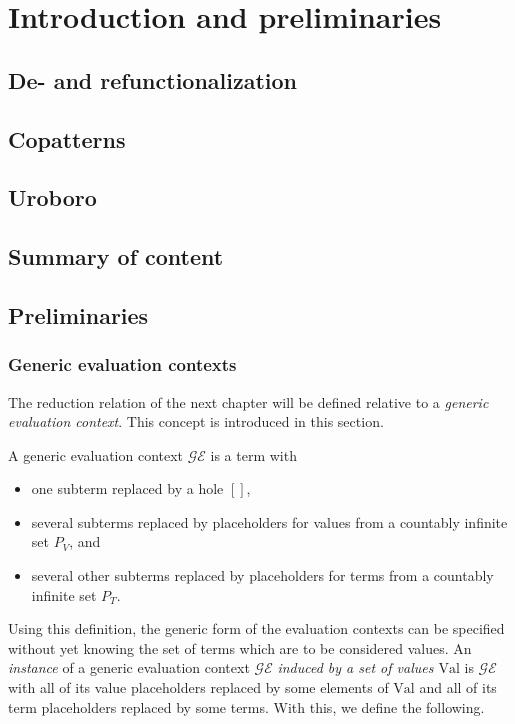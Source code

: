 \chapter{Introduction and preliminaries}

\section{De- and refunctionalization}

\section{Copatterns}

\section{Uroboro}

\section{Summary of content}

\section{Preliminaries}

\subsection{Generic evaluation contexts}

The reduction relation of the next chapter will be defined relative to a \textit{generic evaluation context}. This concept is introduced in this section.

\begin{definition}
A generic evaluation context $\mathcal{GE}$ is a term with
\begin{itemize}
\item one subterm replaced by a hole $[]$,
\item several subterms replaced by placeholders for values from a countably infinite set $P_V$, and
\item several other subterms replaced by placeholders for terms from a countably infinite set $P_T$.
\end{itemize}
\end{definition}

Using this definition, the generic form of the evaluation contexts can be specified without yet knowing the set of terms which are to be considered values. An \textit{instance} of a generic evaluation context $\mathcal{GE}$ \textit{induced by a set of values $\textrm{Val}$} is $\mathcal{GE}$ with all of its value placeholders replaced by some elements of $\textrm{Val}$ and all of its term placeholders replaced by some terms. With this, we define the following.

